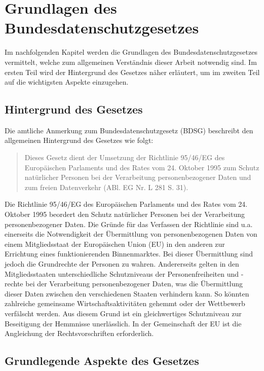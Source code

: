 \chapter{Grundlagen des Bundesdatenschutzgesetzes}
Im nachfolgenden Kapitel werden die Grundlagen des Bundesdatenschutzgesetzes vermittelt, welche zum allgemeinen Verständnis dieser Arbeit notwendig sind. Im ersten Teil wird der Hintergrund des Gesetzes näher erläutert, um im zweiten Teil auf  die wichtigsten Aspekte einzugehen.
\section{Hintergrund des Gesetzes}
Die amtliche Anmerkung zum Bundesdatenschutzgesetz (\acs{BDSG}) beschreibt den allgemeinen Hintergrund des Gesetzes wie folgt:
\begin{quote}
\glqq Dieses Gesetz dient der Umsetzung der Richtlinie 95/46/EG des Europäischen Parlaments und des Rates vom 24. Oktober 1995 zum Schutz natürlicher Personen bei der Verarbeitung personenbezogener Daten und zum freien Datenverkehr (ABl. EG Nr. L 281 S. 31).\grqq \autocite[][]{DeJureBDSG}
\end{quote}
Die Richtlinie 95/46/EG des Europäischen Parlaments und des Rates vom 24. Oktober 1995 beordert den Schutz natürlicher Personen bei der Verarbeitung personenbezogener Daten. Die Gründe für das Verfassen der Richtlinie sind u.a. einerseits die Notwendigkeit der Übermittlung von personenbezogenen Daten von einem Mitgliedsstaat der Europäischen Union (\acs{EU}) in den anderen zur Errichtung eines funktionierenden Binnenmarktes. Bei dieser Übermittlung sind jedoch die Grundrechte der Personen zu wahren. Andererseits gelten in den Mitgliedsstaaten unterschiedliche Schutzniveaus der Personenfreiheiten und -rechte bei der Verarbeitung personenbezogener Daten, was die Übermittlung dieser Daten zwischen den verschiedenen Staaten verhindern kann. So könnten zahlreiche gemeinsame Wirtschaftsaktivitäten gehemmt oder der Wettbewerb verfälscht werden. Aus diesem Grund ist ein gleichwertiges Schutzniveau zur Beseitigung der Hemmnisse unerlässlich. In der Gemeinschaft der EU ist die Angleichung der Rechtsvorschriften erforderlich.\autocite[vgl.][]{EU.1995}\\
\section{Grundlegende Aspekte des Gesetzes}
